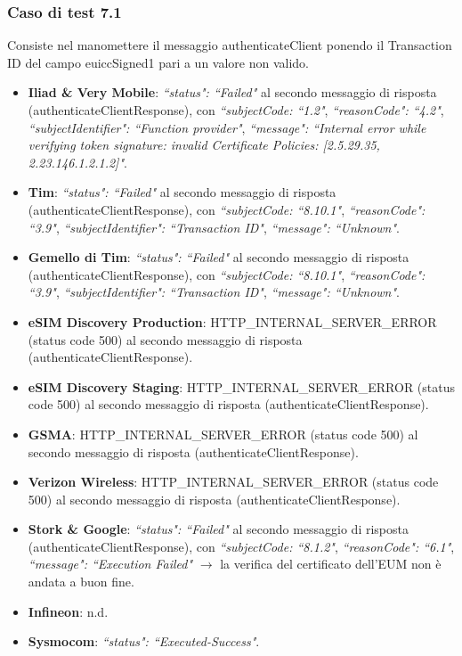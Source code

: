 \documentclass[10pt, oneside]{book}
\begin{document}
\subsubsection{Caso di test 7.1}
Consiste nel manomettere il messaggio authenticateClient ponendo il Transaction ID del campo euiccSigned1 pari a un valore non valido.
\begin{itemize}
\item \textbf{Iliad \& Very Mobile}: \textit{``status": ``Failed"} al secondo messaggio di risposta (authenticateClientResponse), con \textit{``subjectCode: ``1.2"}, \textit{``reasonCode": ``4.2"}, \textit{``subjectIdentifier": ``Function provider"}, \textit{``message": ``Internal error while verifying token signature: invalid Certificate Policies: [2.5.29.35, 2.23.146.1.2.1.2]"}.
\item \textbf{Tim}: \textit{``status": ``Failed"} al secondo messaggio di risposta (authenticateClientResponse), con \textit{``subjectCode: ``8.10.1"}, \textit{``reasonCode": ``3.9"}, \textit{``subjectIdentifier": ``Transaction ID"}, \textit{``message": ``Unknown"}.
\item \textbf{Gemello di Tim}: \textit{``status": ``Failed"} al secondo messaggio di risposta (authenticateClientResponse), con \textit{``subjectCode: ``8.10.1"}, \textit{``reasonCode": ``3.9"}, \textit{``subjectIdentifier": ``Transaction ID"}, \textit{``message": ``Unknown"}.
\item \textbf{eSIM Discovery Production}: HTTP\_INTERNAL\_SERVER\_ERROR (status code 500) al secondo messaggio di risposta (authenticateClientResponse).
\item \textbf{eSIM Discovery Staging}: HTTP\_INTERNAL\_SERVER\_ERROR (status code 500) al secondo messaggio di risposta (authenticateClientResponse).
\item \textbf{GSMA}: HTTP\_INTERNAL\_SERVER\_ERROR (status code 500) al secondo messaggio di risposta (authenticateClientResponse).
\item \textbf{Verizon Wireless}: HTTP\_INTERNAL\_SERVER\_ERROR (status code 500) al secondo messaggio di risposta (authenticateClientResponse).
\item \textbf{Stork \& Google}: \textit{``status": ``Failed"} al secondo messaggio di risposta (authenticateClientResponse), con \textit{``subjectCode: ``8.1.2"}, \textit{``reasonCode": ``6.1"}, \textit{``message": ``Execution Failed"} $\rightarrow$ la verifica del certificato dell'EUM non è andata a buon fine.
\item \textbf{Infineon}: n.d.
\item \textbf{Sysmocom}: \textit{``status": ``Executed-Success"}.

\end{itemize}
\end{document}
